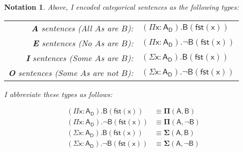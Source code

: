 \documentclass{article}
\newtheorem{notation}{Notation}
\newcommand\e{\mathsf}
\def\Domain/{\e{D}}
\newcommand\Dep[2]{\e{#1(#2)}}
\def\PiBinder/{\e{\Pi}}
\def\SigmaBinder/{\e{\Sigma}}
\newcommand\Abstr[3]{\e{(\PiBinder/#1 : #2). #3}}
\newcommand\Prod[3]{\e{(\SigmaBinder/#1 : #2). #3}}
\newcommand\First[1]{\e{fst(#1)}}
\newcommand\Gen[2]{\e{#1_{#2}}}
\newcommand\PI[2]{\mathbf{\Pi}\e{(#1, #2)}}
\newcommand\SIG[2]{\mathbf{\Sigma}\e{(#1, #2)}}
\begin{document}
\begin{notation}

Above, I encoded categorical sentences as the following types:

\begin{center}
\begin{tabular}{r l}
  \textbf{A} sentences (All $A$s are $B$): & $\Abstr{x}{\Gen{A}{\Domain/}}{\Dep{B}{\First{x}}}$ \\
  \textbf{E} sentences (No $A$s are $B$): & $\Abstr{x}{\Gen{A}{\Domain/}}{\lnot \Dep{B}{\First{x}}}$ \\
  \textbf{I} sentences (Some $A$s are $B$): & $\Prod{x}{\Gen{A}{\Domain/}}{\Dep{B}{\First{x}}}$ \\
  \textbf{O} sentences (Some $A$s are not $B$): & $\Prod{x}{\Gen{A}{\Domain/}}{\lnot \Dep{B}{\First{x}}}$
\end{tabular}
\end{center}

I abbreviate these types as follows:

\begin{align*}
  \Abstr{x}{\Gen{A}{\Domain/}}{\Dep{B}{\First{x}}} &\equiv \PI{A}{B} \\
  \Abstr{x}{\Gen{A}{\Domain/}}{\lnot \Dep{B}{\First{x}}} &\equiv \PI{A}{\lnot B} \\
  \Prod{x}{\Gen{A}{\Domain/}}{\Dep{B}{\First{x}}} &\equiv \SIG{A}{B} \\
  \Prod{x}{\Gen{A}{\Domain/}}{\lnot \Dep{B}{\First{x}}} &\equiv \SIG{A}{\lnot B}
\end{align*}

\end{notation}
\end{document}
